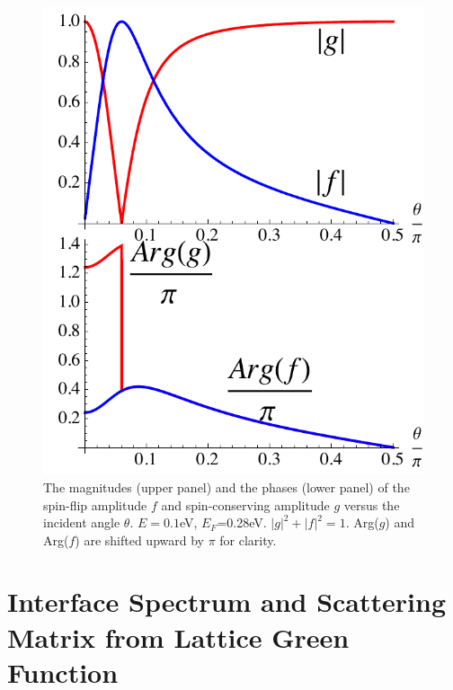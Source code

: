 \begin{figure}
\center
\includegraphics[width=\textwidth]{include/scatt.pdf}
\caption{ The magnitudes (upper panel) and the phases (lower panel) of the spin-flip 
amplitude $f$ and spin-conserving amplitude $g$ versus the incident angle $\theta$.
$E=0.1$eV, $E_F$=0.28eV. $|g|^2+|f|^2=1$. Arg($g$) and Arg($f$) 
are shifted upward by $\pi$ for clarity.}
\end{figure}

\section{Interface Spectrum and Scattering Matrix from Lattice Green Function} 


